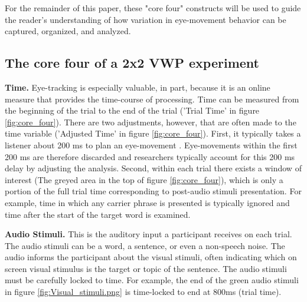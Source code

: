 For the remainder of this paper, these "core four" constructs will be used to guide the reader's understanding of how variation in eye-movement behavior can be captured, organized, and analyzed. 

\subsection{The core four of a 2x2 VWP experiment}

\textbf{Time.} Eye-tracking is especially valuable, in part, because it is an online measure that provides the time-course of processing. Time can be measured from the beginning of the trial to the end of the trial ('Trial Time' in figure \ref{fig:core_four}). There are two adjustments, however, that are often made to the time variable ('Adjusted Time'  in figure \ref{fig:core_four}). First, it typically takes a listener about 200 ms to plan an eye-movement \parencite[][]{Matin_Shao_Boff_1993}. Eye-movements within the first 200 ms are therefore discarded and researchers typically account for this 200 ms delay by adjusting the analysis. Second, within each trial there exists a window of interest (The greyed area in the top of figure \ref{fig:core_four}), which is only a portion of the full trial time corresponding to post-audio stimuli presentation. For example, time in which any carrier phrase is presented is typically ignored and time after the start of the target word is examined.

\textbf{Audio Stimuli.} This is the auditory input a participant receives on each trial. The audio stimuli can be a word, a sentence, or even a non-speech noise. The audio informs the participant about the visual stimuli, often indicating which on screen visual stimulus is the target or topic of the sentence. The audio stimuli must be carefully locked to time. For example, the end of the green audio stimuli in figure \ref{fig:Visual_stimuli.png} is time-locked to end at 800ms (trial time).

